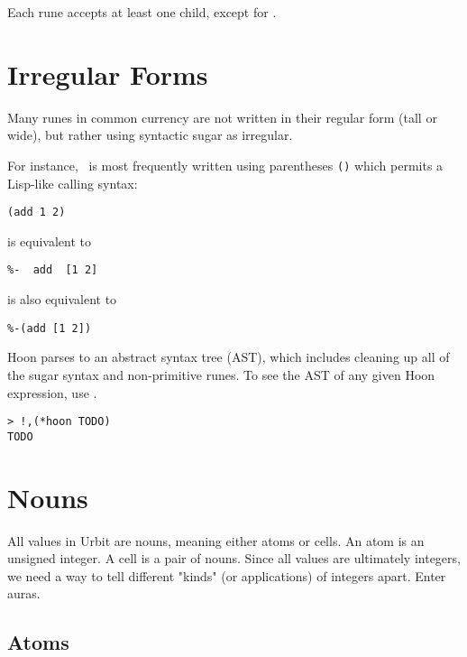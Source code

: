 Each rune accepts at least one child, except for \pzapzap.

\section{Irregular Forms}

Many runes in common currency are not written in their regular form (tall or wide), but rather using syntactic sugar as irregular.

For instance, \pcenhep~is most frequently written using parentheses \texttt{()} which permits a Lisp-like calling syntax:

\begin{lstlisting}
(add 1 2)
\end{lstlisting}

is equivalent to

\begin{lstlisting}
%-  add  [1 2]
\end{lstlisting}

is also equivalent to

\begin{lstlisting}
%-(add [1 2])
\end{lstlisting}



Hoon parses to an abstract syntax tree (AST), which includes cleaning up all of the sugar syntax and non-primitive runes.  To see the AST of any given Hoon expression, use \pzapcom.

\begin{lstlisting}[style=nonumbers]
> !,(*hoon TODO)
TODO
\end{lstlisting}

\section{Nouns}

All values in Urbit are nouns, meaning either atoms or cells.  An atom is an unsigned integer.  A cell is a pair of nouns.  Since all values are ultimately integers, we need a way to tell different "kinds" (or applications) of integers apart.  Enter auras.

\subsection{Atoms}


